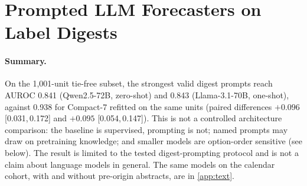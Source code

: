 \documentclass[11pt]{article}
\newcommand{\compact}{Compact-7\xspace}
\newcommand{\ci}[2]{[#1,\,#2]}
\begin{document}
\section{Prompted LLM Forecasters on Label Digests}
\label{app:llm}
\paragraph{Summary.} On the 1{,}001-unit tie-free subset, the strongest valid digest prompts reach
AUROC 0.841 (Qwen2.5-72B, zero-shot) and 0.843 (Llama-3.1-70B, one-shot), against 0.938 for
\compact refitted on the same units (paired differences $+0.096$ \ci{0.031}{0.172} and $+0.095$
\ci{0.054}{0.147}). This is not a controlled architecture comparison: the baseline is supervised,
prompting is not; named prompts may draw on pretraining knowledge; and smaller models are
option-order sensitive (see below). The result is limited to the tested digest-prompting
protocol and is not a claim about language models in general. The same models on the calendar
cohort, with and without pre-origin abstracts, are in \cref{app:text}.
\end{document}
